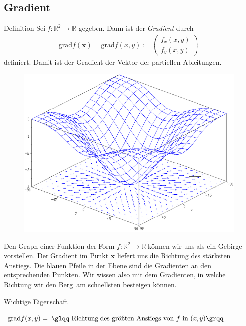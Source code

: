 \newpage


\subsection{Gradient}

\begin{mybox}{Definition}
Sei $f : \mathbb{R}^2 \to \mathbb{R}$ gegeben.
Dann ist der \textit{Gradient} durch
\begin{align*}
\mathrm{grad} f(\textbf{x}) = 
\mathrm{grad} f(x,y) :=
\begin{pmatrix}
f_x(x,y)\\
f_y(x,y)
\end{pmatrix}
\end{align*}
definiert.
Damit ist der Gradient der Vektor der partiellen Ableitungen.
\end{mybox}

\begin{figure}[H]
\centering
\includegraphics[scale=0.5]{sections/pics/gradient.png}
\end{figure}
Den Graph einer Funktion der Form $f : \mathbb{R}^2 \to \mathbb{R} $ können wir uns als ein Gebirge vorstellen. 
Der Gradient im Punkt $\textbf{x}$ liefert uns die Richtung des stärksten Anstiegs.
Die blauen Pfeile in der Ebene sind die Gradienten an den entsprechenden Punkten.
Wir wissen also mit dem Gradienten, in welche Richtung wir den \glqq Berg\grqq~am schnellsten besteigen können.
\\
\begin{mybox}{Wichtige Eigenschaft}
\begin{center}
$\mathrm{grad} f(x,y) = \ \text{\glqq Richtung des größten Anstiegs von $f$ in $(x,y)$\grqq}$
\end{center}
\end{mybox}
